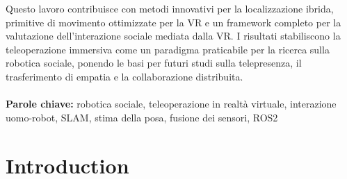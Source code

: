 \documentclass{Configuration_Files/PoliMi3i_thesis}
\begin{document}
Questo lavoro contribuisce con metodi innovativi per la localizzazione ibrida, primitive di movimento ottimizzate per la VR e un framework completo per la valutazione dell'interazione sociale mediata dalla VR. I risultati stabiliscono la teleoperazione immersiva come un paradigma praticabile per la ricerca sulla robotica sociale, ponendo le basi per futuri studi sulla telepresenza, il trasferimento di empatia e la collaborazione distribuita.\\
\\
\textbf{Parole chiave:} robotica sociale, teleoperazione in realtà virtuale, interazione uomo-robot, SLAM, stima della posa, fusione dei sensori, ROS2%


\thispagestyle{empty}
\tableofcontents %
\thispagestyle{empty}
\cleardoublepage

%
%
%    
%


\mainmatter %


\chapter{Introduction}

\end{document}
